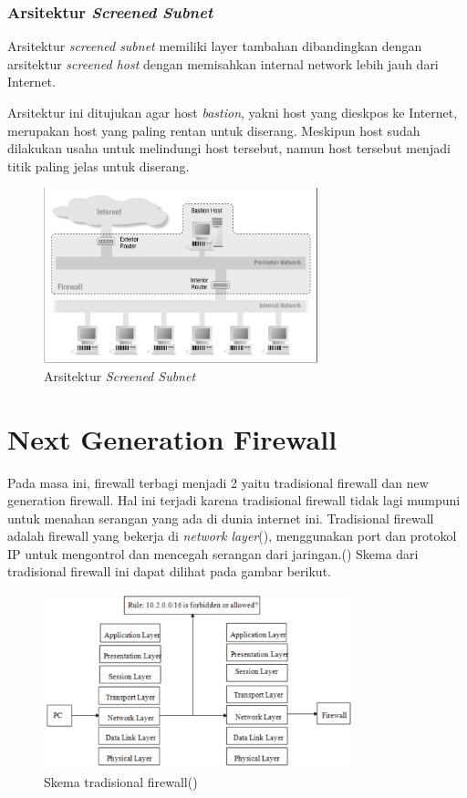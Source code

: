 \subsubsection{Arsitektur \textit{Screened Subnet}}

Arsitektur \textit{screened subnet} memiliki layer tambahan dibandingkan dengan arsitektur \textit{screened host} dengan memisahkan internal network lebih jauh dari Internet.

Arsitektur ini ditujukan agar host \textit{bastion}, yakni host yang dieskpos ke Internet, merupakan host yang paling rentan untuk diserang. Meskipun host sudah dilakukan usaha untuk melindungi host tersebut, namun host tersebut menjadi titik paling jelas untuk diserang.

\begin{figure}[H]
	\centering
	\includegraphics[width=300px]{resources/screened_subnet.png}
	\caption{Arsitektur \textit{Screened Subnet}}
	\label{fig:screened_subnet}
\end{figure}

\section{Next Generation Firewall}
Pada masa ini, firewall terbagi menjadi 2 yaitu tradisional firewall dan new generation firewall. Hal ini terjadi karena tradisional firewall tidak lagi mumpuni untuk menahan serangan yang ada di dunia internet ini. 
Tradisional firewall adalah firewall yang bekerja di \textit{network layer}(\cite{nicoll2004challenges}), menggunakan port dan protokol IP untuk mengontrol dan mencegah serangan dari jaringan.(\cite{zhong2012design}) Skema dari tradisional firewall ini dapat dilihat pada gambar berikut.
\begin{figure}[H]
	\centering
	\includegraphics[width=0.8\textwidth]{resources/tradisional_firewall.png}
	\caption{Skema tradisional firewall(\cite{zhong2012design})}
	\label{fig:tradisional_firewall}
\end{figure}

